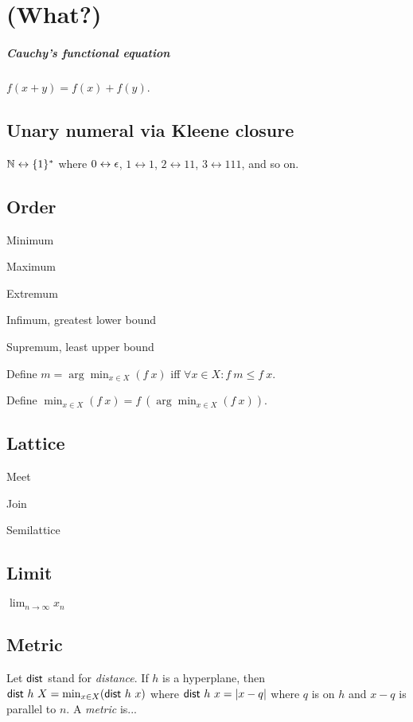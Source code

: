 \chapter{(What?)}

\paragraph{Cauchy's functional equation}
\(f(x+y) = f(x)+f(y)\).

\section{Unary numeral via Kleene closure}

\(\mathbb{N} \leftrightarrow \{1\}^*\)
where \(0 \leftrightarrow \epsilon\), \(1 \leftrightarrow 1\), \(2 \leftrightarrow 11\), \(3 \leftrightarrow 111\), and so on.

\section{Order}

Minimum

Maximum

Extremum

Infimum, greatest lower bound

Supremum, least upper bound

%
Define \(m = \arg\min_{x \in X}(f~x)\) iff \(\forall x \in X : f~m \le f~x\).

%
Define \(\min_{x \in X}(f~x) = f~(\arg\min_{x \in X}(f~x))\).

\section{Lattice}

Meet

Join

Semilattice

\section{Limit}

\(\lim_{n \to \infty} x_n\)

\section{Metric}

%
%
Let \(\textsf{dist}\) stand for \emph{distance}.
If \(h\) is a hyperplane,
then \(\textsf{dist}~h~X = \min_{x \in X} (\textsf{dist}~h~x)\)
where \(\textsf{dist}~h~x = |x-q|\) where \(q\) is on \(h\) and \(x-q\) is parallel to \(n\).
%
A \emph{metric} is...

